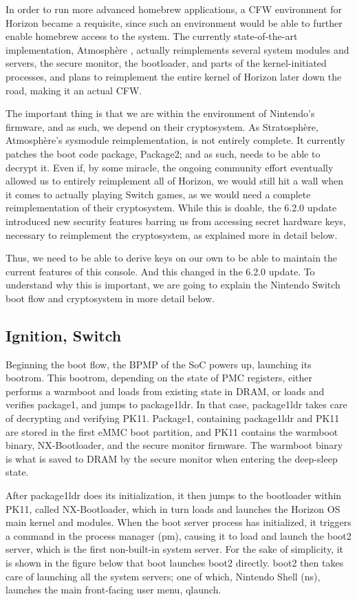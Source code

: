 \documentclass[journal]{IEEEtran}
\begin{document}
In order to run more advanced homebrew applications, a CFW environment for Horizon became a
requisite, since such an environment would be able to further enable homebrew access to the system.
The currently state-of-the-art implementation, Atmosphère \cite{atmosphere}, actually
reimplements several system modules and servers, the secure monitor, the bootloader, and parts of
the kernel-initiated processes, and plans to reimplement the entire kernel of Horizon later down
the road, making it an actual CFW.

The important thing is that we are within the environment of Nintendo's firmware, and as such,
we depend on their cryptosystem. As Stratosphère, Atmosphère's sysmodule reimplementation, is not
entirely complete. It currently patches the boot code package, Package2; and as such, needs to be
able to decrypt it.
Even if, by some miracle, the ongoing community effort eventually allowed us to entirely
reimplement all of Horizon, we would still hit a wall when it comes to actually playing Switch
games, as we would need a complete reimplementation of their cryptosystem. While
this is doable, the 6.2.0 update introduced new security features barring us
from accessing secret hardware keys, necessary to reimplement the cryptosystem, 
as explained more in detail below. 

Thus, we need to be able to derive keys on our own to be able to maintain the current features
of this console. And this changed in the 6.2.0 update. To understand why this is important,
we are going to explain the Nintendo Switch boot flow and cryptosystem in more detail below.

\subsection{Ignition, Switch}

Beginning the boot flow, the BPMP of the SoC powers up, launching its bootrom. This bootrom, 
depending on the state of PMC registers, either performs a warmboot and loads from existing state
in DRAM, or loads and verifies package1, and jumps to package1ldr. In that case, package1ldr takes
care of decrypting and verifying PK11. Package1, containing package1ldr and PK11 are stored in the
first eMMC boot partition, and PK11 contains the warmboot binary, NX-Bootloader, and the secure
monitor firmware. The warmboot binary is what is saved to DRAM by the secure monitor when entering
the deep-sleep state.

After package1ldr does its initialization, it then jumps to the bootloader within PK11, called
NX-Bootloader, which in turn loads and launches the Horizon OS main kernel and modules. When
the boot server process has initialized, it triggers a command in the process manager (pm), 
causing it to load and launch the boot2 server, which is the first non-built-in system server.
For the sake of simplicity, it is shown in the figure below that boot launches boot2 directly.
boot2 then takes care of launching all the system servers; one of which, Nintendo Shell (ns),
launches the main front-facing user menu, qlaunch.
\end{document}
